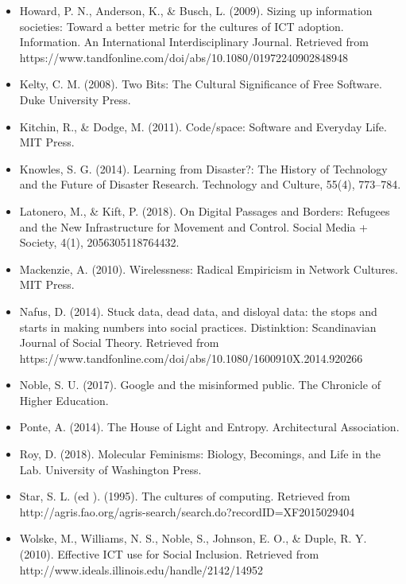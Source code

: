 \documentclass[a4paper,man,natbib]{apa6}
\begin{document}
\begin{itemize}[label={},itemindent=-2em,leftmargin=2em]
   \item Howard, P. N., Anderson, K., \& Busch, L. (2009). Sizing up information societies: Toward a better metric for the cultures of ICT adoption. Information. An International Interdisciplinary Journal. Retrieved from https://www.tandfonline.com/doi/abs/10.1080/01972240902848948

   \item Kelty, C. M. (2008). Two Bits: The Cultural Significance of Free Software. Duke University Press.

   \item Kitchin, R., \& Dodge, M. (2011). Code/space: Software and Everyday Life. MIT Press.

   \item Knowles, S. G. (2014). Learning from Disaster?: The History of Technology and the Future of Disaster Research. Technology and Culture, 55(4), 773–784.

   \item Latonero, M., \& Kift, P. (2018). On Digital Passages and Borders: Refugees and the New Infrastructure for Movement and Control. Social Media + Society, 4(1), 2056305118764432.

   \item Mackenzie, A. (2010). Wirelessness: Radical Empiricism in Network Cultures. MIT Press.

   \item Nafus, D. (2014). Stuck data, dead data, and disloyal data: the stops and starts in making numbers into social practices. Distinktion: Scandinavian Journal of Social Theory. Retrieved from https://www.tandfonline.com/doi/abs/10.1080/1600910X.2014.920266

   \item Noble, S. U. (2017). Google and the misinformed public. The Chronicle of Higher Education.

   \item Ponte, A. (2014). The House of Light and Entropy. Architectural Association.

   \item Roy, D. (2018). Molecular Feminisms: Biology, Becomings, and Life in the Lab. University of Washington Press.

   \item Star, S. L. (ed ). (1995). The cultures of computing. Retrieved from http://agris.fao.org/agris-search/search.do?recordID=XF2015029404

   \item Wolske, M., Williams, N. S., Noble, S., Johnson, E. O., \& Duple, R. Y. (2010). Effective ICT use for Social Inclusion. Retrieved from http://www.ideals.illinois.edu/handle/2142/14952

   \end{itemize}

   \setlength{\parindent}{4em}
   
\end{document}
